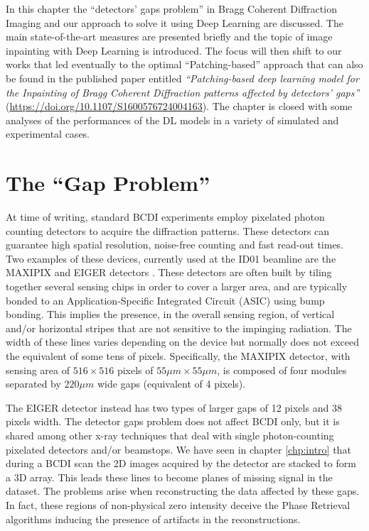 
In this chapter the ``detectors' gaps problem'' in Bragg Coherent Diffraction Imaging and our approach to solve it
using Deep Learning are discussed. The main state-of-the-art measures are presented briefly and
the topic of image inpainting with Deep Learning is introduced. The focus will then shift to our works that led
eventually to the optimal ``Patching-based'' approach that can also be found in the published paper entitled
 \textit{``Patching-based deep learning model for the Inpainting of Bragg Coherent Diffraction patterns affected 
 by detectors' gaps''} (\url{https://doi.org/10.1107/S1600576724004163}). The chapter is closed with some analyses 
 of the performances of the DL models in a variety of simulated and experimental cases.  

\section{The ``Gap Problem''}\label{sec:gaps}

At time of writing, standard BCDI experiments employ pixelated photon counting detectors to acquire the diffraction
patterns. These detectors can guarantee high spatial resolution, noise-free counting and fast read-out times. Two examples 
of these devices, currently used at the ID01 beamline are the MAXIPIX and EIGER detectors \cite{ponchut_maxipix_2011, Eiger_Johnson_2014}.
These detectors are often built by tiling together several sensing chips in order to cover a larger area, and are
typically bonded to an Application-Specific Integrated Circuit (ASIC) using bump bonding. 
This implies the presence, in the overall sensing region, of vertical and/or horizontal stripes that are not sensitive
to the impinging radiation. The width of these lines varies depending on the device but normally does not exceed the equivalent 
of some tens of pixels. Specifically, the MAXIPIX detector, with sensing area of $516\times516$ pixels of 
$55\mu m\times55\mu m$, is composed of four modules separated by $220\mu m$ wide gaps (equivalent of 4 pixels). 

The EIGER detector instead has two types of larger gaps of 12 pixels and 38 pixels width.
The detector gaps problem does not affect BCDI only, but it is shared among other x-ray techniques that deal with single photon-counting
pixelated detectors and/or beamstops.
We have seen in chapter \ref{chp:intro} that during a BCDI scan the 2D images acquired by the detector are stacked to form
a 3D array. This leads these lines to become planes of missing signal in the dataset.
The problems arise when reconstructing the data affected by these gaps. In fact, these regions of non-physical zero intensity
deceive the Phase Retrieval algorithms inducing the presence of artifacts in the reconstructions\cite{carnis_towards_2019}.


